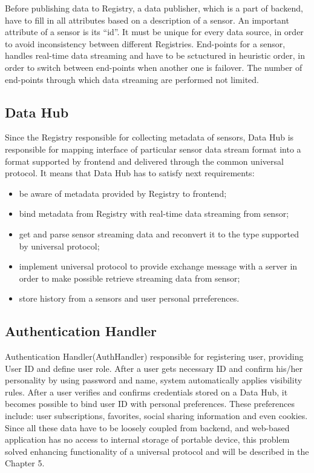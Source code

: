     Before publishing data to Registry, a data publisher, which is a part of backend, have to fill in all attributes based on a description of a sensor. An important attribute of a sensor is its ``id''. It must be unique for every data source, in order to avoid inconsistency between different Registries. End-points for a sensor, handles real-time data streaming and have to be sctuctured in heuristic order, in order to switch between end-points when another one is failover. The number of end-points through which data streaming are performed not limited.

  \subsection{Data Hub}
    Since the Registry responsible for collecting metadata of sensors, Data Hub is responsible for mapping interface of particular sensor data stream format into a format supported by frontend and delivered through the common universal protocol. It means that Data Hub has to satisfy next requirements:

    \begin{itemize}
    \item be aware of metadata provided by Registry to frontend;
    \item bind metadata from Registry with real-time data streaming from sensor;
    \item get and parse sensor streaming data and reconvert it to the type supported by universal protocol;
    \item implement universal protocol to provide exchange message with a server in order to make possible retrieve streaming data from sensor;
    \item store history from a sensors and user personal prreferences.
    \end{itemize}

    \subsection{Authentication Handler}
    Authentication Handler(AuthHandler) responsible for registering user, providing User ID and define user role. After a user gets necessary ID and confirm his/her personality by using password and name, system automatically applies visibility rules. After a user verifies and confirms credentials stored on a Data Hub, it becomes possible to bind user ID with personal preferences. These preferences include: user subscriptions, favorites, social sharing information and even cookies. Since all these data have to be loosely coupled from backend, and web-based application has no access to internal storage of portable device, this problem solved enhancing functionality of a universal protocol and will be described in the Chapter 5.

